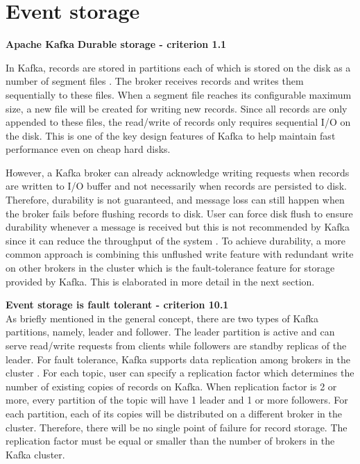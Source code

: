 \section{Event storage}
\textbf{Apache Kafka}
\textbf{Durable storage - criterion 1.1}

In Kafka, records are stored in partitions each of which is stored on the disk as a number of segment files \cite{kafkadocumentation}. The broker receives records and writes them sequentially to these files. When a segment file reaches its configurable maximum size, a new file will be created for writing new records. Since all records are only appended to these files, the read/write of records only requires sequential I/O on the disk. This is one of the key design features of Kafka to help maintain fast performance even on cheap hard disks.  

However, a Kafka broker can already acknowledge writing requests when records are written to I/O buffer and not necessarily when records are persisted to disk. Therefore, durability is not guaranteed, and message loss can still happen when the broker fails before flushing records to disk. User can force disk flush to ensure durability whenever a message is received but this is not recommended by Kafka since it can reduce the throughput of the system \cite{kafkadocumentation}. To achieve durability, a more common approach is combining this unflushed write feature with redundant write on other brokers in the cluster which is the fault-tolerance feature for storage provided by Kafka. This is elaborated in more detail in the next section.

\textbf{Event storage is fault tolerant - criterion 10.1}\\
As briefly mentioned in the general concept, there are two types of Kafka partitions, namely, leader and follower. The leader partition is active and can serve read/write requests from clients while followers are standby replicas of the leader. For fault tolerance, Kafka supports data replication among brokers in the cluster \cite{kafkadatareplication}. For each topic, user can specify a replication factor which determines the number of existing copies of records on Kafka.  When replication factor is 2 or more, every partition of the topic will have 1 leader and 1 or more followers. For each partition, each of its copies will be distributed on a different broker in the cluster. Therefore, there will be no single point of failure for record storage. The replication factor must be equal or smaller than the number of brokers in the Kafka cluster.

